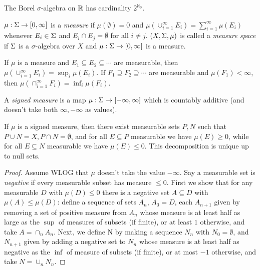 \documentclass[letterpaper,11pt]{report}
\begin{document}
\begin{cor} The Borel $\sigma$-algebra on $\mathbb{R}$ has cardinality $2^{\aleph_0}$.
\end{cor}

\begin{defn} $\mu:\Sigma \rightarrow [0,\infty]$ is a \emph{measure} if $\mu(\emptyset) = 0$ and $\mu(\cup_{i=1}^\infty E_i) = \sum_{i=1}^\infty \mu(E_i)$ whenever $E_i \in \Sigma$ and $E_i \cap E_j = \emptyset$ for all $i \ne j$. $(X,\Sigma, \mu)$ is called a \emph{measure space} if $\Sigma$ is a $\sigma$-algebra over $X$ and $\mu : \Sigma \rightarrow [0,\infty]$ is a measure.
\end{defn}

\begin{prop} If $\mu$ is a measure and $E_1 \subseteq E_2 \subseteq \cdots$ are measurable, then $\mu(\cup_{i=1}^\infty E_i) = \sup_i \mu(E_i)$. If $F_1 \supseteq F_2 \supseteq \cdots$ are measurable and $\mu(F_1) < \infty$, then $\mu(\cap_{i=1}^\infty F_i) = \inf_i \mu(F_i)$.
\end{prop}

\begin{defn} A \emph{signed measure} is a map $\mu:\Sigma \rightarrow [-\infty,\infty]$ which is countably additive (and doesn't take both $\infty, -\infty$ as values).
\end{defn}

\begin{thm}\label{hahn-decomposition} If $\mu$ is a signed measure, then there exist measurable sets $P,N$ such that $P\cup N = X, P \cap N = \emptyset$, and for all $E \subseteq P$ measurable we have $\mu(E) \ge 0$, while for all $E \subseteq N$ measurable we have $\mu(E) \le 0$. This decomposition is unique up to null sets.
\end{thm}
\begin{proof} Assume WLOG that $\mu$ doesn't take the value $-\infty$. Say a measurable set is \emph{negative} if every measurable subset has measure $\le 0$. First we show that for any measurable $D$ with $\mu(D) \le 0$ there is a negative set $A \subseteq D$ with $\mu(A) \le \mu(D)$: define a sequence of sets $A_n$, $A_0 = D$, each $A_{n+1}$ given by removing a set of positive measure from $A_n$ whose measure is at least half as large as the $\sup$ of measures of subsets (if finite), or at least $1$ otherwise, and take $A = \cap_n A_n$. Next, we define N by making a sequence $N_n$ with $N_0 = \emptyset$, and $N_{n+1}$ given by adding a negative set to $N_n$ whose measure is at least half as negative as the $\inf$ of measure of subsets (if finite), or at most $-1$ otherwise, and take $N = \cup_n N_n$.
\end{proof}
\end{document}
